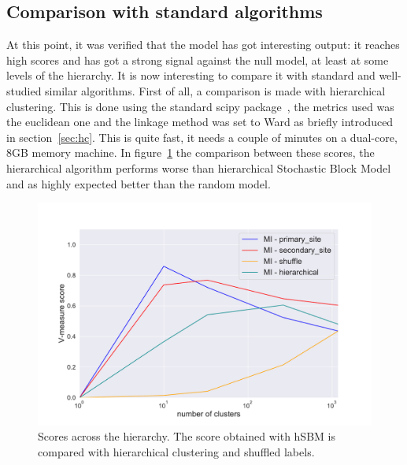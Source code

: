 \subsection{Comparison with standard algorithms}
At this point, it was verified that the model has got interesting output: it reaches high scores and has got a strong signal against the null model, at least at some levels of the hierarchy. It is now interesting to compare it with standard and well-studied similar algorithms.
First of all, a comparison is made with hierarchical clustering. This is done using the standard scipy package~\cite{jones2014scipy}, the metrics used was the euclidean one and the linkage method was set to Ward as briefly introduced in section~\ref{sec:hc}. This is quite fast, it needs a couple of minutes on a dual-core, 8GB memory machine.
In figure~\ref{fig:topic/gtex/oversigma_10tissue/metric_scores_hier} the comparison between these scores, the hierarchical algorithm performs worse than hierarchical Stochastic Block Model and as highly expected better than the random model.
\begin{figure}[htb!]
    \centering
    \includegraphics[width=0.9\linewidth]{pictures/topic/gtex/oversigma_10tissue/metric_scores_hier.pdf}
    \caption{Scores across the hierarchy. The score obtained with hSBM is compared with hierarchical clustering and shuffled labels.}
    \label{fig:topic/gtex/oversigma_10tissue/metric_scores_hier}
\end{figure}

